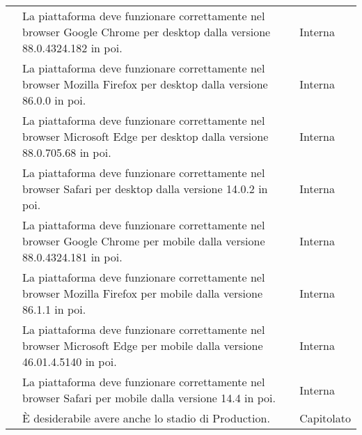 \begin{longtable}{c C{9.5cm} C{2.5cm}}
	 & La piattaforma deve funzionare correttamente nel browser Google Chrome per desktop dalla versione 88.0.4324.182 in poi. & Interna \\

	 & La piattaforma deve funzionare correttamente nel browser Mozilla Firefox per desktop dalla versione 86.0.0 in poi. & Interna \\

	 & La piattaforma deve funzionare correttamente nel browser Microsoft Edge per desktop dalla versione 88.0.705.68 in poi. & Interna \\

	 & La piattaforma deve funzionare correttamente nel browser Safari per desktop dalla versione 14.0.2 in poi. & Interna \\

	 & La piattaforma deve funzionare correttamente nel browser Google Chrome per mobile dalla versione 88.0.4324.181 in poi. & Interna \\

	 & La piattaforma deve funzionare correttamente nel browser Mozilla Firefox per mobile dalla versione 86.1.1 in poi. & Interna \\

	 & La piattaforma deve funzionare correttamente nel browser Microsoft Edge per mobile dalla versione 46.01.4.5140 in poi. & Interna \\

	 & La piattaforma deve funzionare correttamente nel browser Safari per mobile dalla versione 14.4 in poi. & Interna \\
	
	 & È desiderabile avere anche lo stadio di Production. & Capitolato \\
	
\end{longtable}

